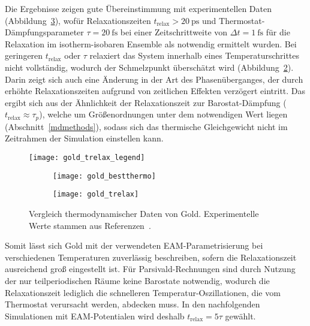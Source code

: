 Die Ergebnisse zeigen gute Übereinstimmung mit experimentellen Daten\cite{haynes_crc_2011,brillo_density_2006} (Abbildung~\ref{fig:goldthermo}), wofür Relaxationszeiten $t_\text{relax} > \SI{20}{\pico\second}$ und Thermostat-Dämpfungsparameter $\tau = \SI{20}{\femto\second}$ bei einer Zeitschrittweite von $\Delta t = \SI{1}{\femto\second}$ für die Relaxation im isotherm-isobaren Ensemble als notwendig ermittelt wurden.
Bei geringeren $t_\text{relax}$ oder $\tau$ relaxiert das System innerhalb eines Temperaturschrittes nicht vollständig, wodurch der Schmelzpunkt überschätzt wird (Abbildung~\ref{fig:goldthermo-b}).
Darin zeigt sich auch eine Änderung in der Art des Phasenüberganges, der durch erhöhte Relaxationszeiten aufgrund von zeitlichen Effekten verzögert eintritt.
Das ergibt sich aus der Ähnlichkeit der Relaxationszeit zur Barostat-Dämpfung ($t_\text{relax}\approx \tau_p$), welche um Größenordnungen unter dem notwendigen Wert liegen (Abschnitt~\ref{mdmethods}), sodass sich das thermische Gleichgewicht nicht im Zeitrahmen der Simulation einstellen kann.

\begin{figure}[tbh]

  \centering
  \captionsetup[subfigure]{singlelinecheck=false}

  \texttt{[image: gold\_trelax\_legend]}

  \def\subfigwidth{7cm}
  \begin{subfigure}[t]{\subfigwidth}
    \texttt{[image: gold\_bestthermo]}
    \label{fig:goldthermo-a}
  \end{subfigure}
  \hfill
  \begin{subfigure}[t]{\subfigwidth}
    \texttt{[image: gold\_trelax]}
    \label{fig:goldthermo-b}
  \end{subfigure}

  \caption[Vergleich thermodynamischer Daten von Gold]{
    Vergleich thermodynamischer Daten von Gold.
    Experimentelle Werte stammen aus Referenzen~\cite{haynes_crc_2011,brillo_density_2006}.
  }
  \label{fig:goldthermo}
\end{figure}

Somit lässt sich Gold mit der verwendeten EAM-Parametrisierung bei verschiedenen Temperaturen zuverlässig beschreiben, sofern die Relaxationszeit ausreichend groß eingestellt ist.
Für Parsivald-Rechnungen sind durch Nutzung der nur teilperiodischen Räume keine Barostate notwendig, wodurch die Relaxationszeit lediglich die schnelleren Temperatur-Oszillationen, die vom Thermostat verursacht werden, abdecken muss.
In den nachfolgenden Simulationen mit EAM-Potentialen wird deshalb $t_\text{relax} = 5 \tau$ gewählt.

